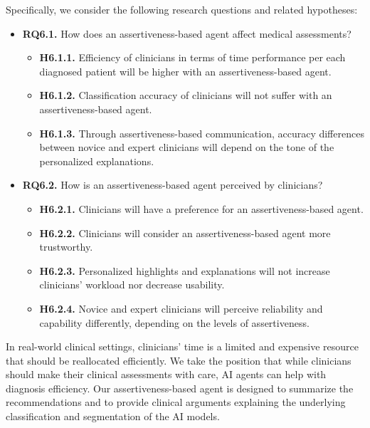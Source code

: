\noindent
Specifically, we consider the following research questions and related hypotheses:

\vspace{0.5mm}

\begin{itemize}
\item {\bf RQ6.1.} How does an assertiveness-based agent affect medical assessments?
\begin{itemize}
\item {\bf H6.1.1.} Efficiency of clinicians in terms of time performance per each diagnosed patient will be higher with an assertiveness-based agent.
\item {\bf H6.1.2.} Classification accuracy of clinicians will not suffer with an assertiveness-based agent.
\item {\bf H6.1.3.} Through assertiveness-based communication, accuracy differences between novice and expert clinicians will depend on the tone of the personalized explanations.
\end{itemize}
\item {\bf RQ6.2.} How is an assertiveness-based agent perceived by clinicians?
\begin{itemize}
\item {\bf H6.2.1.} Clinicians will have a preference for an assertiveness-based agent.
\item {\bf H6.2.2.} Clinicians will consider an assertiveness-based agent more trustworthy.
\item {\bf H6.2.3.} Personalized highlights and explanations will not increase clinicians' workload nor decrease usability.
\item {\bf H6.2.4.} Novice and expert clinicians will perceive reliability and capability differently, depending on the levels of assertiveness.
\end{itemize}
\end{itemize}

In real-world clinical settings, clinicians' time is a limited and expensive resource that should be reallocated efficiently.
We take the position that while clinicians should make their clinical assessments with care, \ac{AI} agents can help with diagnosis efficiency.
Our assertiveness-based agent is designed to summarize the recommendations and to provide clinical arguments explaining the underlying classification and segmentation of the \ac{AI} models.

